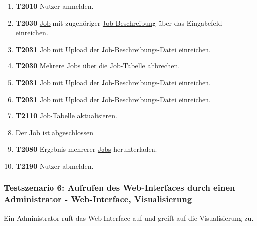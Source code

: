 \begin{enumerate}
     \item \textbf{T2010} \gls{Nutzer} anmelden.

     \item \textbf{T2030} \hyperref[B:Jobs]{Job} mit zugehöriger \hyperref[B:Job-Beschreibung]{Job-Beschreibung} über das Eingabefeld einreichen.
        
     \item \textbf{T2031} \hyperref[B:Jobs]{Job} mit Upload der \hyperref[B:Job-Beschreibung]{Job-Beschreibungs}-Datei einreichen.
     
     \item \textbf{T2030} Mehrere Jobs über die Job-Tabelle abbrechen.
     
     \item \textbf{T2031} \hyperref[B:Jobs]{Job} mit Upload der \hyperref[B:Job-Beschreibung]{Job-Beschreibungs}-Datei einreichen.
     
     \item \textbf{T2031} \hyperref[B:Jobs]{Job} mit Upload der \hyperref[B:Job-Beschreibung]{Job-Beschreibungs}-Datei einreichen.
     
     \item \textbf{T2110} Job-Tabelle aktualisieren.
     
     \item Der \hyperref[B:Jobs]{Job} ist abgeschlossen
     
     \item \textbf{T2080} Ergebnis mehrerer \hyperref[B:Jobs]{Jobs} herunterladen.
     
     \item \textbf{T2190} \gls{Nutzer} abmelden.
\end{enumerate}


\subsubsection{Testszenario 6: Aufrufen des Web-Interfaces durch einen Administrator - Web-Interface, Visualisierung}
Ein \gls{Administrator} ruft das \gls{Web-Interface} auf und greift auf die Visualisierung zu.

